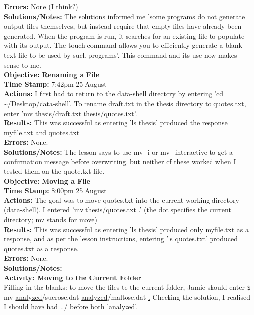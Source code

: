 \documentclass{article}
\begin{document}
\begin{FlushLeft}
\textbf{Errors:} None (I think?)\\
\textbf{Solutions/Notes:} The solutions informed me 'some programs do not generate output files themselves, but instead require that empty files have already been generated. When the program is run, it searches for an existing file to populate with its output. The touch command allows you to efficiently generate a blank text file to be used by such programs'. This command and its use now makes sense to me.\\
\vspace{5mm}
\textbf{Objective: Renaming a File}\\ 
\textbf{Time Stamp:} 7:42pm 25 August\\
\textbf{Actions:} I first had to return to the data-shell directory by entering 'cd \~{}/Desktop/data-shell'. To rename draft.txt in the thesis directory to quotes.txt, enter 'mv thesis/draft.txt thesis/quotes.txt'. \\
\textbf{Results:} This was successful as entering 'ls thesis' produced the response my\textunderscore file.txt and quotes.txt \\
\textbf{Errors:} None. \\
\textbf{Solutions/Notes:} The lesson says to use mv -i or mv --interactive to get a confirmation message before overwriting, but neither of these worked when I tested them on the quote.txt file.\\
\vspace{5mm}
\textbf{Objective: Moving a File}\\ 
\textbf{Time Stamp:} 8:00pm 25 August\\
\textbf{Actions:} The goal was to move quotes.txt into the current working directory (data-shell). I entered 'mv thesis/quotes.txt .' (the dot specifies the current directory; mv stands for move)\\
\textbf{Results:} This was successful as entering 'ls thesis' produced only my\textunderscore file.txt as a response, and as per the lesson instructions, entering 'ls quotes.txt' produced quotes.txt as a response. \\
\textbf{Errors:} None.\\
\textbf{Solutions/Notes:}\\
\vspace{5mm}
\textbf{Activity: Moving to the Current Folder}\\ 
Filling in the blanks: to move the files to the current folder, Jamie should enter \verb|$| mv \underline{analyzed}/sucrose.dat \underline{analyzed}/maltose.dat \underline{.} Checking the solution, I realised I should have had ../ before both 'analyzed'.\\

\end{FlushLeft}
\end{document}
